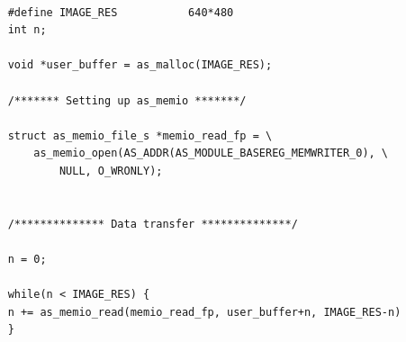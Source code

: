 \begin{footnotesize}
    \begin{lstlisting}[label=lst:memio_simple]
    
    #define IMAGE_RES           640*480
    int n;
    
    void *user_buffer = as_malloc(IMAGE_RES);
    
    /******* Setting up as_memio *******/
    
    struct as_memio_file_s *memio_read_fp = \
        as_memio_open(AS_ADDR(AS_MODULE_BASEREG_MEMWRITER_0), \
            NULL, O_WRONLY);
    
    
    /************** Data transfer **************/
    
    n = 0;
    
    while(n < IMAGE_RES) {
    n += as_memio_read(memio_read_fp, user_buffer+n, IMAGE_RES-n)
    }
    
    \end{lstlisting}
\end{footnotesize}

